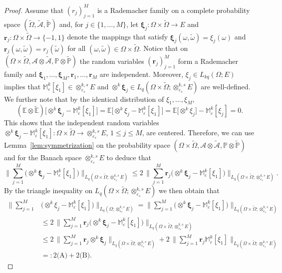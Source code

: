 \documentclass[reqno]{amsart}
\numberwithin{equation}{section}
\newcommand{\bbE}{\mathbb{E}}
\newcommand{\bbM}{\mathbb{M}}
\newcommand{\bbP}{\mathbb{P}}
\newcommand{\cA}{\mathcal{A}}
\newcommand{\Omegat}{\widetilde{\Omega}}
\newcommand{\omegat}{\widetilde{\omega}}
\newcommand{\cAt}{\widetilde{\cA}}
\newcommand{\bbPt}{\widetilde{\bbP}}
\newcommand{\bbEt}{\widetilde{\bbE}}
\newcommand{\rvec}{\boldsymbol{r}}
\newcommand{\xivec}{\boldsymbol{\xi}}
\newcommand{\xk}{\otimes^k}
\newcommand{\xkseps}{\otimes^{k,s}_{\varepsilon_s}}
\newcommand{\Mk}{\bbM^k_\varepsilon}
\newcommand{\from}{\colon}
\theoremstyle{remark}
\theoremstyle{definition}
\begin{document}
\begin{proof} 
	Assume that $(r_j)_{j=1}^M$ is 
	a Rademacher family on a complete probability space 
	$(\Omegat,\cAt,\bbPt)$ 
	and, for $j\in\{1,\ldots,M\}$, 
	let $\xivec_j\from\Omega\times\Omegat\to E$ 
	and $\rvec_j\from\Omega\times\Omegat\to \{-1,1\}$ denote the mappings 
	that satisfy $\xivec_j(\omega,\omegat) = \xi_j(\omega)$ 
	and $\rvec_j(\omega,\omegat) = r_j(\omegat)$ 
	for all $(\omega,\omegat)\in\Omega\times\Omegat$. 
	Notice that 
	on $(\Omega \times \Omegat,\cA \otimes \cAt,\bbP\otimes\bbPt)$ 
	the random variables 
	$(\rvec_j)_{j=1}^M$ form a Rademacher family and 
	$\xivec_1,\ldots,\xivec_M,\rvec_1,\ldots,\rvec_M$ 
	are independent. 
	Moreover,  
	$\xi_j \in L_{kq}(\Omega;E)$ implies that 
	$\Mk[\xi_1] \in \xkseps E$ and 
	$\xk \xivec_j \in L_q(\Omega\times\widetilde{\Omega};\xkseps E)$ 
	are well-defined. 
	We further note that by the identical distribution 
	of $\xi_1,\ldots,\xi_M$, 
	\[
	(\bbE\otimes\bbEt)\bigl[  \xk \xivec_j  -  \Mk[\xi_1] \bigr]  
	= 
	\bbE\bigl[ \xk \xi_j -  \Mk[\xi_1] \bigr]  
	=
	\bbE\bigl[ \xk \xi_j \bigr] -  \Mk[\xi_j]  
	= 
	0. 
	\]  
	This shows that the independent random variables 
	$\xk \xivec_j  -  \Mk[\xi_1]\from \Omega\times\Omegat \to \xkseps E$, 
	$1\leq j\leq M$, 
	are centered. 
	Therefore, 
	we can use Lemma~\ref{lem:symmetrization}  
	on the 
	probability space 
	$(\Omega \times \Omegat,\cA \otimes \cAt,\bbP\otimes\bbPt)$ 
	and for the Banach space $\xkseps E$ to deduce that 
	\[
	\biggl\| 
	\sum_{j=1}^M 
	\bigl( \xk \xivec_j  
	-  \Mk[\xi_1] \bigr)
	\biggr\|_{L_q(\Omega\times\widetilde{\Omega};\xkseps E)} 
	\leq 
	2\, 
	\biggl\| 
	\sum_{j=1}^M 
	\rvec_j 
	\bigl( \xk \xivec_j  
	-  \Mk[\xi_1] \bigr)
	\biggr\|_{L_q(\Omega\times\widetilde{\Omega};\xkseps E)} . 
	\]
	By the triangle inequality 
	on $L_q(\Omega\times\widetilde{\Omega};\xkseps E)$ 
	we then obtain 
	that 
	\begin{equation}\label{eq:proof:thm:MC-k:A-B} 
	\begin{split}  
	\biggl\| 
	\sum_{j=1}^M 
	&\bigl(\xk \xi_j 
	-  \Mk[\xi_1] \bigr)
	\biggr\|_{L_q(\Omega;\xkseps E)} 
	= 
	\biggl\| 
	\sum_{j=1}^M 
	\bigl( \xk \xivec_j  
	-  \Mk[\xi_1] \bigr)
	\biggr\|_{L_q(\Omega\times\widetilde{\Omega};\xkseps E)} 
	\\
	&\leq 
	2\, 
	\biggl\| 
	\sum_{j=1}^M 
	\rvec_j 
	\bigl( \xk \xivec_j  
	-  \Mk[\xi_1] \bigr)
	\biggr\|_{L_q(\Omega\times\widetilde{\Omega};\xkseps E)}  
	\\
	&\leq 
	2\, 
	\biggl\| 
	\sum_{j=1}^M 
	\rvec_j 
	\xk\! \xivec_j  
	\biggr\|_{L_q(\Omega\times\widetilde{\Omega};\xkseps E)}   
	+ 
	2\, 
	\biggl\| 
	\sum_{j=1}^M 
	\rvec_j 
	\Mk[\xi_1] 
	\biggr\|_{L_q(\Omega\times\widetilde{\Omega};\xkseps E)}   
	\\
	&=: 
	2\text{(A)} + 2\text{(B)}. 
	\end{split} 
	\end{equation} 
	

\end{proof}
\end{document}
